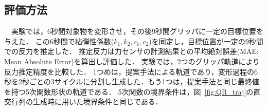 \documentclass[a4paper]{jarticle}
\begin{document}
\subsection{評価方法}
　実験では，6秒間対象物を変形させ，その後9秒間グリッパに一定の目標位置を与えた．
この6秒間で粘弾性係数($k_1, k_2, c_1, c_2$)を同定し，目標位置が一定の9秒間での反力を推定した．
推定反力は力センサの計測結果との平均絶対誤差(MAE: Mean Absolute Error)を算出し評価した．
実験では，2つのグリッパ軌道により反力推定精度を比較した．
1つめは，提案手法による軌道であり，変形過程の6秒を2秒ごとの3サイクルに分割し生成した．もう1つは，提案手法と同じ最終値を持つ5次関数形状の軌道である．
5次関数の境界条件は，図~{\ref{fig:QR_traj}}の直交行列の生成時に用いた境界条件と同じである．
\end{document}
